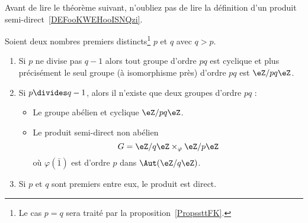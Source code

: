 Avant de lire le théorème suivant, n'oubliez pas de lire la définition d'un produit semi-direct~\ref{DEFooKWEHooISNQzi}.
\begin{theorem} \label{ThoLnTMBy}
    Soient deux nombres premiers distincts\footnote{Le cas \( p=q\) sera traité par la proposition~\ref{PropssttFK}.} \( p\) et \( q\) avec \( q>p\).
    \begin{enumerate}
        \item
    Si \( p\) ne divise pas \( q-1\) alors tout groupe d'ordre \( pq\) est cyclique et plus précisément le seul groupe (à isomorphisme près) d'ordre \( pq\) est \( \eZ/pq\eZ\).
\item       \label{ITEMooFQXIooFLAiUD}
        Si \( p\divides q-1\), alors il n'existe que deux groupes d'ordre \( pq\) :
        \begin{itemize}
            \item Le groupe abélien et cyclique \( \eZ/pq\eZ\).
            \item Le produit semi-direct non abélien
                \begin{equation}    \label{EqNuuTRE}
                    G=\eZ/q\eZ\times_{\varphi}\eZ/p\eZ
                \end{equation}
                où \( \varphi(\bar 1)\) est d'ordre \( p\) dans \( \Aut(\eZ/q\eZ)\).
        \end{itemize}

    \item

        Si \( p\) et \( q\) sont premiers entre eux, le produit est direct.
    \end{enumerate}
\end{theorem}

